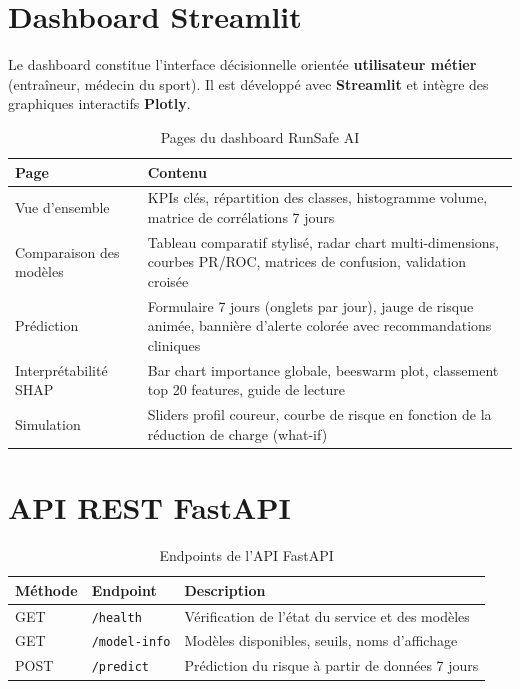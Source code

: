 \documentclass[12pt,a4paper]{report}
\begin{document}
\section{Dashboard Streamlit}

Le dashboard constitue l'interface décisionnelle orientée \textbf{utilisateur métier}
(entraîneur, médecin du sport). Il est développé avec \textbf{Streamlit} et intègre des
graphiques interactifs \textbf{Plotly}.

\begin{table}[H]
\centering
\begin{tabularx}{\textwidth}{lX}
\toprule
\textbf{Page} & \textbf{Contenu} \\
\midrule
Vue d'ensemble & KPIs clés, répartition des classes, histogramme volume, matrice de corrélations 7 jours \\
Comparaison des modèles & Tableau comparatif stylisé, radar chart multi-dimensions, courbes PR/ROC, matrices de confusion, validation croisée \\
Prédiction & Formulaire 7 jours (onglets par jour), jauge de risque animée, bannière d'alerte colorée avec recommandations cliniques \\
Interprétabilité SHAP & Bar chart importance globale, beeswarm plot, classement top 20 features, guide de lecture \\
Simulation & Sliders profil coureur, courbe de risque en fonction de la réduction de charge (what-if) \\
\bottomrule
\end{tabularx}
\caption{Pages du dashboard RunSafe AI}
\end{table}

\section{API REST FastAPI}

\begin{table}[H]
\centering
\begin{tabular}{lll}
\toprule
\textbf{Méthode} & \textbf{Endpoint} & \textbf{Description} \\
\midrule
GET & \texttt{/health} & Vérification de l'état du service et des modèles \\
GET & \texttt{/model-info} & Modèles disponibles, seuils, noms d'affichage \\
POST & \texttt{/predict} & Prédiction du risque à partir de données 7 jours \\
\bottomrule
\end{tabular}
\caption{Endpoints de l'API FastAPI}
\end{table}
\end{document}
